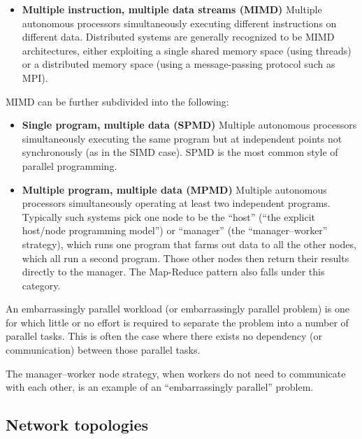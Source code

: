 \documentclass[justified, sixbynine]{tufte-book}
\theoremstyle{plain}%
\newtheorem * {corollary}{Corollary}
\theoremstyle{definition}
\theoremstyle{remark}
\newtheorem * {remark}{Remark}
\newtheorem * {note}{Note}
\begin{document}
\begin{fullwidth}
\begin{itemize}
\item {\bf Multiple instruction, multiple data streams (MIMD)}
Multiple autonomous processors simultaneously executing different instructions on different data. Distributed systems are generally recognized to be MIMD architectures, either exploiting a single shared memory space (using threads) or a distributed memory space (using a message-passing protocol such as MPI).
\end{itemize}


MIMD can be further subdivided into the following:
\begin{itemize}

\item {\bf Single program, multiple data (SPMD)}
Multiple autonomous processors simultaneously executing the same program but at independent points not synchronously (as in the SIMD case). SPMD is the most common style of parallel programming.

\item {\bf Multiple program, multiple data (MPMD)}
Multiple autonomous processors simultaneously operating at least two independent programs. Typically such systems pick one node to be the ``host'' (``the explicit host/node programming model'') or ``manager'' (the ``manager--worker'' strategy), which runs one program that farms out data to all the other nodes, which all run a second program. Those other nodes then return their results directly to the manager. The Map-Reduce pattern also falls under this category.
\end{itemize}

An embarrassingly parallel workload (or embarrassingly parallel problem) is one for which little or no effort is required to separate the problem into a number of parallel tasks. This is often the case where there exists no dependency (or communication) between those parallel tasks.

The manager--worker node strategy, when workers do not need to communicate with each other, is an example of an ``embarrassingly parallel'' problem.


\goodbreak\subsection{Network topologies}



\end{fullwidth}
\end{document}
